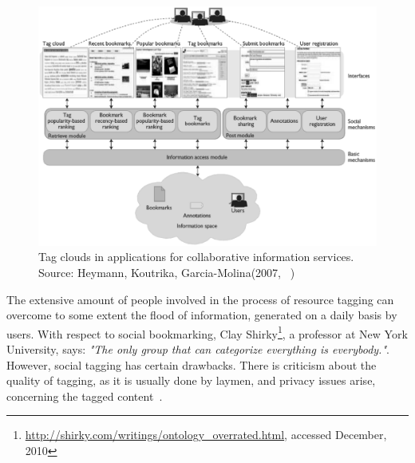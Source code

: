 \begin{figure}
	\centering
	\includegraphics[scale=0.6]{img/collaborativeTagging} 
	\caption[Tag clouds in collaborative information services]
           {Tag clouds in applications for collaborative information services. Source: Heymann, Koutrika, Garcia-Molina(2007, ~\cite{tagcloud_spam2007})}
\label{collaborativeTagging}
\end{figure}

The extensive amount of people involved in the process of resource tagging can overcome to some extent the flood of information, generated on a daily basis by users. With respect to social bookmarking, Clay Shirky\footnote{\url{http://shirky.com/writings/ontology_overrated.html}, accessed December, 2010}, a professor at New York University, says: \textit{"The only group that can categorize everything is everybody."}. However, social tagging has certain drawbacks. There is criticism about the quality of tagging, as it is usually done by laymen, and privacy issues arise, concerning the tagged content~\cite{folksonomiesWeb2.0_2009}. \\


